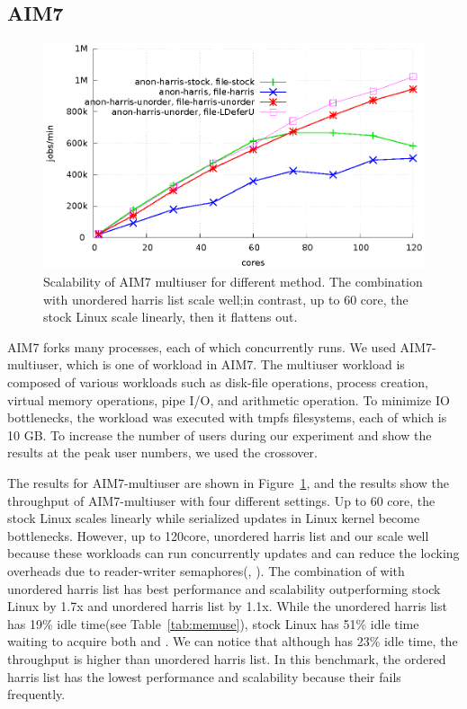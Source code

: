\subsection{AIM7}

\begin{figure}[tb]
  \begin{center}
    \includegraphics[scale=0.65]{graph/aim7.eps}
  \end{center}
  \caption{Scalability of AIM7 multiuser for different method.  The combination
   with unordered harris list scale well;in contrast, up to 60 core, the
  stock Linux scale linearly, then it  flattens out.}
  \label{fig:aim7}
\end{figure}

AIM7 forks many processes, each of which concurrently runs. 
We used AIM7-multiuser, which is one of workload in AIM7.
The multiuser workload is composed of various workloads such as disk-file
operations, process creation, virtual memory operations, pipe I/O, and
arithmetic operation.
To minimize IO bottlenecks, the workload was executed with tmpfs filesystems, each
of which is 10 GB.
To increase the number of users during our experiment and show the results at the
peak user numbers, 
we used the crossover.

The results for AIM7-multiuser are shown in Figure~\ref{fig:aim7}, and the
results show the throughput of AIM7-multiuser with four different settings.
Up to 60 core, the stock Linux scales linearly while serialized updates in
Linux kernel become bottlenecks. 
However, up to 120core, unordered harris list and our  scale well because
these workloads can run concurrently updates and can reduce the locking
overheads due to reader-writer semaphores(,
).
The combination of  with unordered harris list has best performance and
scalability outperforming stock Linux by 1.7x and unordered harris list by
1.1x.
While the unordered harris list has 19\% idle time(see
Table~\ref{tab:memuse}), stock Linux has 51\% idle time waiting to acquire
both  and .
We can notice that although  has 23\% idle time, the throughput is higher than
unordered harris list.
In this benchmark, the ordered harris list has the lowest performance and
scalability because their  fails frequently.

